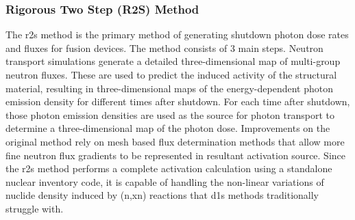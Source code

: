\documentclass[12pt]{article}
\begin{document}
\subsubsection{Rigorous Two Step (R2S) Method}
The \gls{r2s} method \cite{r2s} is the primary method of generating shutdown
photon dose rates and fluxes for fusion devices. The method consists of 3 main
steps.  Neutron transport simulations generate a detailed three-dimensional
map of multi-group neutron fluxes.  These are used to predict the induced
activity of the structural material, resulting in three-dimensional maps of
the energy-dependent photon emission density for different times after
shutdown.  For each time after shutdown, those photon emission densities are
used as the source for photon transport to determine a three-dimensional map
of the photon dose.  Improvements on the original method rely on mesh based
flux determination methods \cite{mcr2s,r2smesh,r2suned,pyne_r2s} that allow
more fine neutron flux gradients to be represented in resultant activation
source.  Since the \gls{r2s} method performs a complete activation calculation
using a standalone nuclear inventory code, it is capable of handling the
non-linear variations of nuclide density induced by (n,xn) reactions
that \gls{d1s} methods traditionally struggle with.
\end{document}
